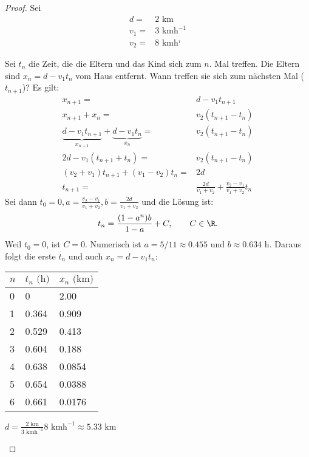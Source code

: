 \begin{proof}
Sei
\begin{align*}
	d=&2\text{ km}\\
	v_1=&3\text{ kmh}^{-1}\\
	v_2=&8\text{ kmh}^{_1}
\end{align*}
	\begin{parts}
	\item 		Sei $t_n$ die Zeit, die die Eltern und das Kind sich zum $n$. Mal treffen. Die Eltern sind $x_n=d-v_1t_n$ vom Haus entfernt. Wann treffen sie sich zum nächsten Mal ($t_{n+1}$)? Es gilt:
	\begin{align*}
		x_{n+1}=& d-v_1t_{n+1}\\
		x_{n+1}+x_n=& v_2(t_{n+1}-t_n)\\
		\underbrace{d-v_1t_{n+1}}_{x_{n+1}}+\underbrace{d-v_1t_n}_{x_n}=&v_2(t_{n+1}-t_n)\\
		2d-v_1(t_{n+1}+t_n)=& v_2(t_{n+1}-t_n)\\
		(v_2+v_1)t_{n+1}+(v_1-v_2)t_n=&2d\\
		t_{n+1}=&\frac{2d}{v_1+v_2}+\frac{v_2-v_1}{v_1+v_2}t_n
	\end{align*}
	Sei dann $t_0=0,a=\frac{v_2-v_1}{v_1+v_2},b=\frac{2d}{v_1+v_2}$ und die L\"{o}sung ist:
	\[
	t_n=\frac{(1-a^n)b}{1-a}+C, \qquad C\in \R
	.\] 
	Weil $t_0=0$, ist $C=0$. Numerisch ist $a=5 / 11\approx 0.455$ und $b\approx 0.634\text{ h}$. Daraus folgt die erste $t_n$ und auch $x_n=d-v_1t_n$:

	\begin{center}
		\begin{tabular}{p{}p{}p{}}
			\toprule
			$n$ & $t_n\text{ (h)}$ & $x_n\text{ (km)}$\\\midrule
0 & 0 & 2.00 \\\midrule
1 & 0.364 & 0.909 \\\midrule
2 & 0.529 & 0.413 \\\midrule
3 & 0.604 & 0.188 \\\midrule
4 & 0.638 & 0.0854 \\\midrule
5 & 0.654 & 0.0388 \\\midrule
6 & 0.661 & 0.0176 \\\bottomrule
		\end{tabular}
	\end{center}
\item $d=\frac{2\text{ km}}{3\text{ kmh}^{-1}}8\text{ kmh}^{-1}\approx 5.33\text{ km}$
	\end{parts}
\end{proof}